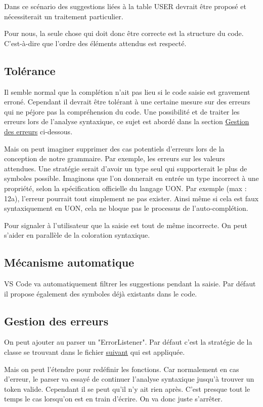 \documentclass[
    iict, %
    il, %
]{heig-tb}
\begin{document}
Dans ce scénario des suggestions liées à la table USER devrait être proposé et nécessiterait un traitement particulier.

Pour nous, la seule chose qui doit donc être correcte est la structure du code. C'est-à-dire que l'ordre des éléments attendus est respecté.

\subsection{Tolérance}
Il semble normal que la complétion n'ait pas lieu si le code saisie est gravement erroné.
Cependant il devrait être tolérant à une certaine mesure sur des erreurs qui ne péjore pas la compréhension du code.
Une possibilité et de traiter les erreurs lors de l'analyse syntaxique, ce sujet est abordé dans la section \hyperref[error handle]{Gestion des erreurs} ci-dessous.

Mais on peut imaginer supprimer des cas potentiels d'erreurs lors de la conception de notre grammaire.
Par exemple, les erreurs sur les valeurs attendues. Une stratégie serait d'avoir un type seul qui supporterait le plus de symboles possible.
Imaginons que l'on donnerait en entrée un type incorrect à une propriété, selon la spécification officielle du langage UON.
Par exemple (max : 12a), l'erreur pourrait tout simplement ne pas exister.
Ainsi même si cela est faux syntaxiquement en UON, cela ne bloque pas le processus de l'auto-complétion.

Pour signaler à l'utilisateur que la saisie est tout de même incorrecte. On peut s'aider en parallèle de la coloration syntaxique.

\subsection{Mécanisme automatique}
VS Code va automatiquement filtrer les suggestions pendant la saisie.
Par défaut il propose également des symboles déjà existants dans le code.

\subsection{Gestion des erreurs}\label{error handle}
On peut ajouter au parser un "ErrorListener".
Par défaut c'est la stratégie de la classe se trouvant dans le fichier \href{https://github.com/tunnelvisionlabs/antlr4ts/blob/master/src/DefaultErrorStrategy.ts}{suivant} qui est appliquée.

Mais on peut l'étendre pour redéfinir les fonctions.
Car normalement en cas d'erreur, le parser va essayé de continuer l'analyse syntaxique jusqu'à trouver un token valide.
Cependant il se peut qu'il n'y ait rien après. C'est presque tout le temps le cas lorsqu'on est en train d'écrire.
On va donc juste s'arrêter.
\end{document}
